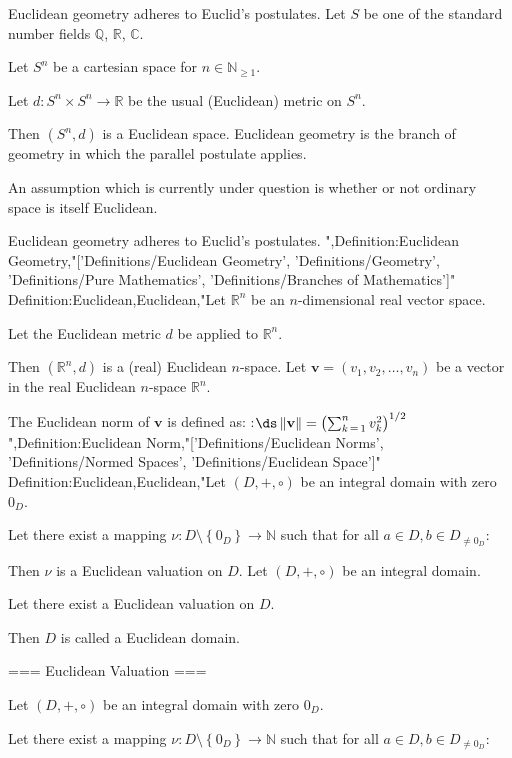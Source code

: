 Euclidean geometry adheres to Euclid's postulates.
Let $S$ be one of the standard number fields $\mathbb Q$, $\mathbb R$, $\mathbb C$.

Let $S^n$ be a cartesian space for $n \in \mathbb N_{\ge 1}$.

Let $d: S^n \times S^n \to \mathbb R$ be the usual (Euclidean) metric on $S^n$.

Then $\left( S^n, d \right)$ is a Euclidean space.
Euclidean geometry is the branch of geometry in which the parallel postulate applies.

An assumption which is currently under question is whether or not ordinary space is itself Euclidean.


Euclidean geometry adheres to Euclid's postulates.
",Definition:Euclidean Geometry,"['Definitions/Euclidean Geometry', 'Definitions/Geometry', 'Definitions/Pure Mathematics', 'Definitions/Branches of Mathematics']"
Definition:Euclidean,Euclidean,"Let $\mathbb R^n$ be an $n$-dimensional real vector space.

Let the Euclidean metric $d$ be applied to $\mathbb R^n$.

Then $\left( \mathbb R^n, d \right)$ is a (real) Euclidean $n$-space.
Let $\mathbf v = \left( v_1, v_2, \ldots, v_n \right)$ be a vector in the real Euclidean $n$-space $\mathbb R^n$.


The Euclidean norm of $\mathbf v$ is defined as:
:$\ds \left\lVert \mathbf v \right\rVert = \left( \sum_{k \mathop = 1}^n v_k^2 \right)^{1/2}$
",Definition:Euclidean Norm,"['Definitions/Euclidean Norms', 'Definitions/Normed Spaces', 'Definitions/Euclidean Space']"
Definition:Euclidean,Euclidean,"Let $\left( D, +, \circ \right)$ be an integral domain with zero $0_D$.

Let there exist a mapping $\nu: D \setminus \left\lbrace 0_D \right\rbrace \to \mathbb N$ such that for all $a \in D, b \in D_{\ne 0_D}$:






Then $\nu$ is a Euclidean valuation on $D$.
Let $\left( D, +, \circ \right)$ be an integral domain.

Let there exist a Euclidean valuation on $D$.

Then $D$ is called a Euclidean domain.


=== Euclidean Valuation ===

Let $\left( D, +, \circ \right)$ be an integral domain with zero $0_D$.

Let there exist a mapping $\nu: D \setminus \left\lbrace 0_D \right\rbrace \to \mathbb N$ such that for all $a \in D, b \in D_{\ne 0_D}$:






